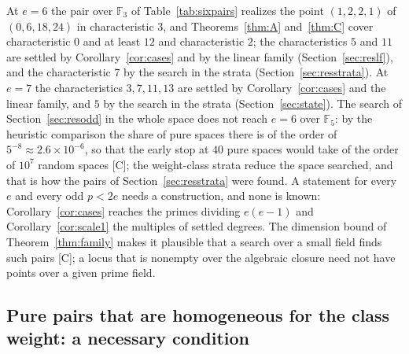 \documentclass[11pt]{article}
\theoremstyle{definition}
\theoremstyle{remark}
\newcommand{\F}{\mathbb{F}}
\begin{document}
At $e=6$ the pair over $\F_3$ of Table~\ref{tab:sixpairs} realizes the point $(1,2,2,1)$ of $(0,6,18,24)$ in characteristic $3$, and Theorems~\ref{thm:A} and~\ref{thm:C} cover characteristic $0$ and at least $12$ and characteristic $2$; the characteristics $5$ and $11$ are settled by Corollary~\ref{cor:cases} and by the linear family (Section~\ref{sec:reslf}), and the characteristic $7$ by the search in the strata (Section~\ref{sec:resstrata}). At $e=7$ the characteristics $3,7,11,13$ are settled by Corollary~\ref{cor:cases} and the linear family, and $5$ by the search in the strata (Section~\ref{sec:state}). The search of Section~\ref{sec:resodd} in the whole space does not reach $e=6$ over $\F_5$: by the heuristic comparison the share of pure spaces there is of the order of $5^{-8}\approx2.6\times10^{-6}$, so that the early stop at $40$ pure spaces would take of the order of $10^{7}$ random spaces [C]; the weight-class strata reduce the space searched, and that is how the pairs of Section~\ref{sec:resstrata} were found. A statement for every $e$ and every odd $p<2e$ needs a construction, and none is known: Corollary~\ref{cor:cases} reaches the primes dividing $e(e-1)$ and Corollary~\ref{cor:scale1} the multiples of settled degrees. The dimension bound of Theorem~\ref{thm:family} makes it plausible that a search over a small field finds such pairs [C]; a locus that is nonempty over the algebraic closure need not have points over a given prime field.

\subsection{Pure pairs that are homogeneous for the class weight: a necessary condition}
\label{sec:strata}
\end{document}
